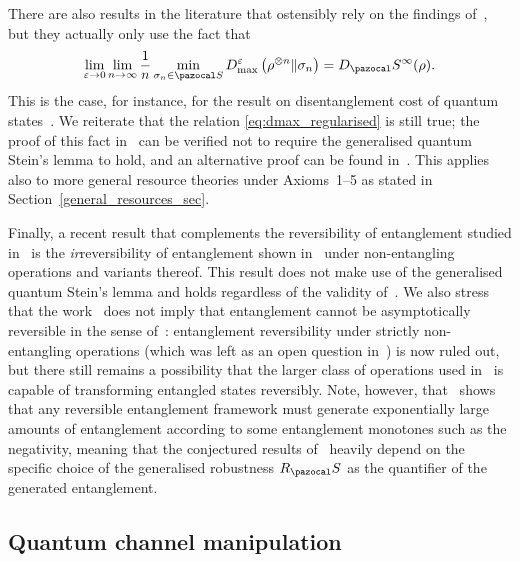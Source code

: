 \documentclass[11pt,notitlepage,tightenlines,nofootinbib,superscriptaddress]{revtex4-1}
\begin{document}
There are also results in the literature that ostensibly rely on the findings of~\cite{Brandao2010}, but they actually only use the fact that
\begin{equation}\begin{aligned}\label{eq:dmax_regularised}
    \lim_{\epsilon \to 0} \lim_{n \to \infty} \frac1n \min_{\sigma_n \in \SEP} D^\epsilon_{\max} \left(\rho^{\otimes n} \| \sigma_n\right) = D_\SEP^\infty(\rho).
\end{aligned}\end{equation}
This %
is the case, for instance, for the result on disentanglement cost of quantum states~\cite{berta_2018}. We reiterate that the relation \eqref{eq:dmax_regularised} is still true; the proof of this fact in~\cite{BrandaoPlenio2} can be verified not to require the generalised quantum Stein's lemma to hold, and an alternative proof can be found in~\cite{datta_2009-2}. This applies also to more general resource theories under Axioms~1--5 as stated in Section~\ref{general_resources_sec}.

Finally, a recent result that complements the reversibility of entanglement studied in~\cite{BrandaoPlenio1,BrandaoPlenio2} is the \emph{ir}reversibility of entanglement shown in~\cite{irreversibility} under non-entangling operations and variants thereof. This result does not make use of the generalised quantum Stein's lemma and holds regardless of the validity of~\cite{Brandao2010}. We also stress that the work~\cite{irreversibility} does not imply that entanglement cannot be asymptotically reversible in the sense of~\cite{BrandaoPlenio1,BrandaoPlenio2}: entanglement reversibility under strictly non-entangling operations (which was left as an open question in~\cite{BrandaoPlenio2}) is now ruled out, but there still remains a possibility that the larger class of operations used in~\cite{BrandaoPlenio1,BrandaoPlenio2} is capable of transforming entangled states reversibly. Note, however, that~\cite{irreversibility} shows that any reversible entanglement framework must generate exponentially large amounts of entanglement according to some entanglement monotones such as the negativity, meaning that the conjectured results of~\cite{BrandaoPlenio1,BrandaoPlenio2} heavily depend on the specific choice of the generalised robustness $R_\SEP$ as the quantifier of the generated entanglement.


\subsection{Quantum channel manipulation}
\end{document}
